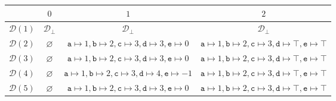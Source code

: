 \begin{table}[H]
    \centering
    \begin{subtable}{\linewidth}
        \centering
        \begin{tabular}{|c|c|c|c|}
            \hline
            & $0$ 
            & $1$ 
            & $2$ \\ \hline
            $\mathcal{D}(1)$ 
            & $\mathcal{D}_\bot$ 
            & $\mathcal{D}_\bot$ 
            & $\mathcal{D}_\bot$ \\
            \hline
            $\mathcal{D}(2)$ 
            & $\varnothing$ 
            & $\texttt{a} \mapsto 1, \texttt{b} \mapsto 2, \texttt{c} \mapsto 3, \texttt{d} \mapsto 3, \texttt{e} \mapsto 0$ 
            & $\texttt{a} \mapsto 1, \texttt{b} \mapsto 2, \texttt{c} \mapsto 3, \texttt{d} \mapsto \top, \texttt{e} \mapsto \top$ \\
            \hline
            $\mathcal{D}(3)$ 
            & $\varnothing$ 
            & $\texttt{a} \mapsto 1, \texttt{b} \mapsto 2, \texttt{c} \mapsto 3, \texttt{d} \mapsto 3, \texttt{e} \mapsto 0$ 
            & $\texttt{a} \mapsto 1, \texttt{b} \mapsto 2, \texttt{c} \mapsto 3, \texttt{d} \mapsto \top, \texttt{e} \mapsto \top$ \\
            \hline
            $\mathcal{D}(4)$ 
            & $\varnothing$ 
            & $\texttt{a} \mapsto 1, \texttt{b} \mapsto 2, \texttt{c} \mapsto 3, \texttt{d} \mapsto 4, \texttt{e} \mapsto -1$ 
            & $\texttt{a} \mapsto 1, \texttt{b} \mapsto 2, \texttt{c} \mapsto 3, \texttt{d} \mapsto \top, \texttt{e} \mapsto \top$ \\
            \hline
            $\mathcal{D}(5)$ 
            & $\varnothing$ 
            & $\texttt{a} \mapsto 1, \texttt{b} \mapsto 2, \texttt{c} \mapsto 3, \texttt{d} \mapsto 3, \texttt{e} \mapsto 0$ 
            & $\texttt{a} \mapsto 1, \texttt{b} \mapsto 2, \texttt{c} \mapsto 3, \texttt{d} \mapsto \top, \texttt{e} \mapsto \top$ \\
            \hline
        \end{tabular}
    \end{subtable}
    
    \vspace{1cm}
    

\end{table}
